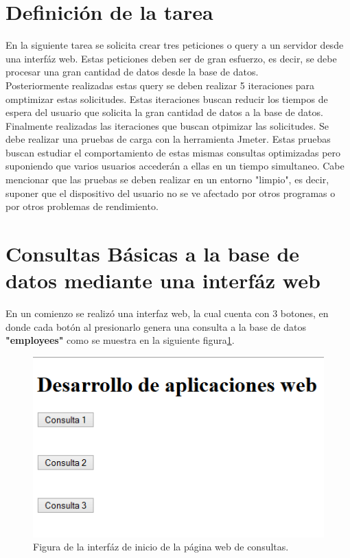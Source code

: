 \section{Definición de la tarea} \label{tarea}

En la siguiente tarea se solicita crear tres peticiones o query a un servidor desde una interfáz web. Estas peticiones deben ser de gran esfuerzo, es decir, se debe procesar una gran cantidad de datos desde la base de datos.\\

Posteriormente realizadas estas query se deben realizar 5 iteraciones para omptimizar estas solicitudes. Estas iteraciones buscan reducir los tiempos de espera del usuario que solicita la gran cantidad de datos a la base de datos.\\

Finalmente realizadas las iteraciones que buscan otpimizar las solicitudes. Se debe realizar una pruebas de carga con la herramienta Jmeter. Estas pruebas buscan estudiar el comportamiento de estas mismas consultas optimizadas pero suponiendo que varios usuarios accederán a ellas en un tiempo simultaneo. Cabe mencionar que las pruebas se deben realizar en un entorno "limpio", es decir, suponer que el dispositivo del usuario no se ve afectado por otros programas o por otros problemas de rendimiento. \\

\section{Consultas Básicas a la base de datos mediante una interfáz web}

En un comienzo se realizó una interfaz web, la cual cuenta con 3 botones, en donde cada botón al presionarlo genera una consulta a la base de datos \textbf{"employees"} como se muestra en la siguiente figura\ref{Figura}. 

\begin{figure}[htb]
	\label{Figura}
	\begin{center}
		\includegraphics[scale=0.5]{imagenes/inicio.png}
	\end{center}
	\caption{Figura de la interfáz de inicio de la página web de consultas.}
\end{figure}

